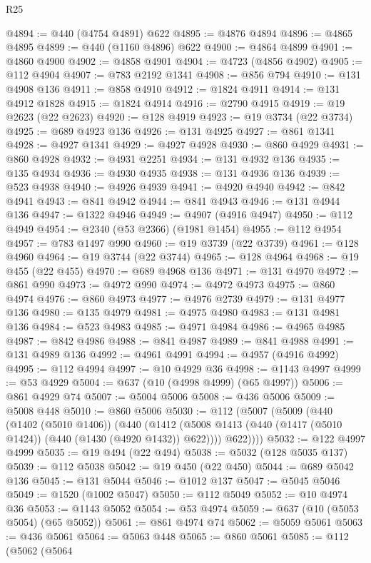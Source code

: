 \begin{lexlean}{R25}
\begin{coremodule}
{{{{{{{{{{{{{{{{{{{{{{{{{{{{{{{{{{{{{{{{{{{{{{{{{{{{{{{{{{{{{{{{{{{{{{{{{{{{{{{{{{{{{{{{{{{{{{{{{{{{{{{{{{{{{{{{{{{{{{{{{{{{{{{{{{{{{{{{{{{{{{{{{{{{{{{{{{{{{{{{{{{{{{{{{{{{{{{{{{{{{{{{{{{{{{{{{{{{{{{@4894 := @440 (@4754 @4891) @622
@4895 := @4876 @4894
@4896 := @4865 @4895
@4899 := @440 (@1160 @4896) @622
@4900 := @4864 @4899
@4901 := @4860 @4900
@4902 := @4858 @4901
@4904 := @4723 (@4856 @4902)
@4905 := @112 @4904
@4907 := @783 @2192 @1341
@4908 := @856 @794
@4910 := @131 @4908 @136
@4911 := @858 @4910
@4912 := @1824 @4911
@4914 := @131 @4912 @1828
@4915 := @1824 @4914
@4916 := @2790 @4915
@4919 := @19 @2623 (@22 @2623)
@4920 := @128 @4919
@4923 := @19 @3734 (@22 @3734)
@4925 := @689 @4923 @136
@4926 := @131 @4925
@4927 := @861 @1341
@4928 := @4927 @1341
@4929 := @4927 @4928
@4930 := @860 @4929
@4931 := @860 @4928
@4932 := @4931 @2251
@4934 := @131 @4932 @136
@4935 := @135 @4934
@4936 := @4930 @4935
@4938 := @131 @4936 @136
@4939 := @523 @4938
@4940 := @4926 @4939
@4941 := @4920 @4940
@4942 := @842 @4941
@4943 := @841 @4942
@4944 := @841 @4943
@4946 := @131 @4944 @136
@4947 := @1322 @4946
@4949 := @4907 (@4916 @4947)
@4950 := @112 @4949
@4954 := @2340 (@53 @2366) (@1981 @1454)
@4955 := @112 @4954
@4957 := @783 @1497 @990
@4960 := @19 @3739 (@22 @3739)
@4961 := @128 @4960
@4964 := @19 @3744 (@22 @3744)
@4965 := @128 @4964
@4968 := @19 @455 (@22 @455)
@4970 := @689 @4968 @136
@4971 := @131 @4970
@4972 := @861 @990
@4973 := @4972 @990
@4974 := @4972 @4973
@4975 := @860 @4974
@4976 := @860 @4973
@4977 := @4976 @2739
@4979 := @131 @4977 @136
@4980 := @135 @4979
@4981 := @4975 @4980
@4983 := @131 @4981 @136
@4984 := @523 @4983
@4985 := @4971 @4984
@4986 := @4965 @4985
@4987 := @842 @4986
@4988 := @841 @4987
@4989 := @841 @4988
@4991 := @131 @4989 @136
@4992 := @4961 @4991
@4994 := @4957 (@4916 @4992)
@4995 := @112 @4994
@4997 := @10 @4929 @36
@4998 := @1143 @4997
@4999 := @53 @4929
@5004 := @637 (@10 (@4998 @4999) (@65 @4997))
@5006 := @861 @4929 @74
@5007 := @5004 @5006
@5008 := @436 @5006
@5009 := @5008 @448
@5010 := @860 @5006
@5030 := @112
    (@5007
      (@5009
        (@440
          (@1402 (@5010 @1406))
          (@440
            (@1412 (@5008 @1413 (@440 (@1417 (@5010 @1424)) (@440 (@1430 (@4920 @1432)) @622))))
            @622))))
@5032 := @122 @4997 @4999
@5035 := @19 @494 (@22 @494)
@5038 := @5032 (@128 @5035 @137)
@5039 := @112 @5038
@5042 := @19 @450 (@22 @450)
@5044 := @689 @5042 @136
@5045 := @131 @5044
@5046 := @1012 @137
@5047 := @5045 @5046
@5049 := @1520 (@1002 @5047)
@5050 := @112 @5049
@5052 := @10 @4974 @36
@5053 := @1143 @5052
@5054 := @53 @4974
@5059 := @637 (@10 (@5053 @5054) (@65 @5052))
@5061 := @861 @4974 @74
@5062 := @5059 @5061
@5063 := @436 @5061
@5064 := @5063 @448
@5065 := @860 @5061
@5085 := @112
    (@5062
      (@5064
}}}}}}}}}}}}}}}}}}}}}}}}}}}}}}}}}}}}}}}}}}}}}}}}}}}}}}}}}}}}}}}}}}}}}}}}}}}}}}}}}}}}}}}}}}}}}}}}}}}}}}}}}}}}}}}}}}}}}}}}}}}}}}}}}}}}}}}}}}}}}}}}}}}}}}}}}}}}}}}}}}}}}}}}}}}}}}}}}}}}}}}}}}}}}}}}}}}}}}}
\end{coremodule}
\end{lexlean}
